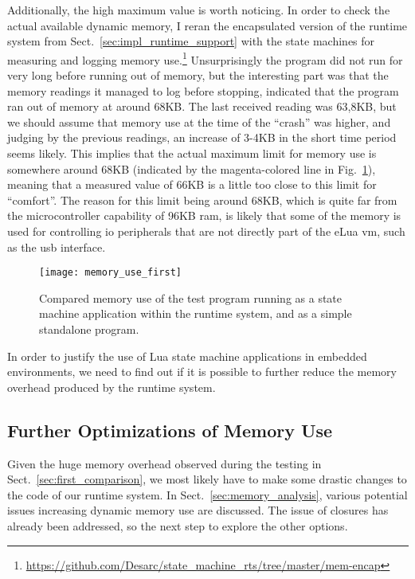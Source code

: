 \noindent
Additionally, the high maximum value is worth noticing. In order to check the actual available dynamic memory, I reran the encapsulated version of the runtime system from Sect.~\ref{sec:impl_runtime_support} with the state machines for measuring and logging memory use.\footnote{\url{https://github.com/Desarc/state_machine_rts/tree/master/mem-encap}} Unsurprisingly the program did not run for very long before running out of memory, but the interesting part was that the memory readings it managed to log before stopping, indicated that the program ran out of memory at around 68KB. The last received reading was 63,8KB, but we should assume that memory use at the time of the ``crash'' was higher, and judging by the previous readings, an increase of 3-4KB in the short time period seems likely. This implies that the actual maximum limit for memory use is somewhere around 68KB (indicated by the magenta-colored line in Fig.~\ref{fig:memory_use_first}), meaning that a measured value of 66KB is a little too close to this limit for ``comfort''. The reason for this limit being around 68KB, which is quite far from the microcontroller capability of 96KB \gls{ram}, is likely that some of the memory is used for controlling \gls{io} peripherals that are not directly part of the eLua \gls{vm}, such as the \gls{usb} interface.

\begin{figure}[htp]
	\centering
	\texttt{[image: memory\_use\_first]}
	\caption[Results of first memory overhead test]{Compared memory use of the test program running as a state machine application within the runtime system, and as a simple standalone program.}
	\label{fig:memory_use_first}
\end{figure}

\noindent
In order to justify the use of Lua state machine applications in embedded environments, we need to find out if it is possible to further reduce the memory overhead produced by the runtime system.

\subsection{Further Optimizations of Memory Use}
\label{sec:more_optimization}
Given the huge memory overhead observed during the testing in Sect.~\ref{sec:first_comparison}, we most likely have to make some drastic changes to the code of our runtime system. In Sect.~\ref{sec:memory_analysis}, various potential issues increasing dynamic memory use are discussed. The issue of closures has already been addressed, so the next step to explore the other options.

